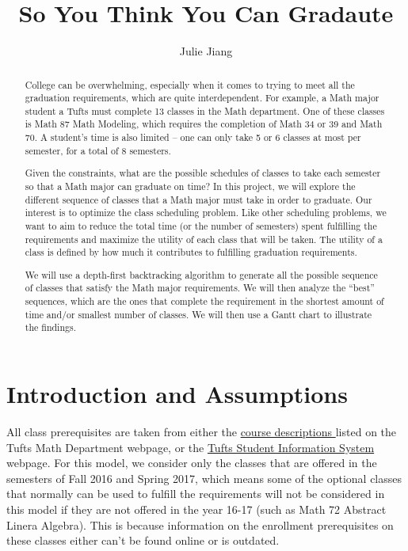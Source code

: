 \documentclass[12pt, oneside]{article}
\title{So You Think You Can Gradaute}
\author{Julie Jiang}
\begin{document}
\maketitle
\begin{abstract}
College can be overwhelming, especially when it comes to trying to meet all the graduation requirements, which are quite interdependent. For example, a Math major student a Tufts must complete 13 classes in the Math department. One of these classes is Math 87 Math Modeling, which requires the completion of Math 34 or 39 and Math 70. A student's time is also limited -- one can only take 5 or 6 classes at most per semester, for a total of 8 semesters. 


Given the constraints, what are the possible schedules of classes to take each semester so that a Math major can graduate on time? In this project, we will explore the different sequence of classes that a Math major must take in order to graduate. Our interest is to optimize the class scheduling problem. Like other scheduling problems, we want to aim to reduce the total time (or the number of semesters) spent fulfilling the requirements and maximize the utility of each class that will be taken. The utility of a class is defined by how much it contributes to fulfilling graduation requirements. 

We will use a depth-first backtracking algorithm to generate all the possible sequence of classes that satisfy the Math major requirements. We will then analyze the ``best'' sequences, which are the ones that complete the requirement in the shortest amount of time and/or smallest number of classes. We will then use a Gantt chart to illustrate the findings.

\end{abstract}
\section{Introduction and Assumptions} 
All class prerequisites are taken from either the \color{blue}\href{http://Math.tufts.edu/courses/}{course descriptions }\color{black}  listed on the Tufts Math Department webpage, or the \color{blue}\href{https://sis.uit.tufts.edu}{Tufts Student Information System }\color{black} webpage. For this model, we consider only the classes that are offered in the semesters of Fall 2016 and Spring 2017, which means some of the optional classes that normally can be used to fulfill the requirements will not be considered in this model if they are not offered in the year 16-17 (such as Math 72 Abstract Linera Algebra). This is because information on the enrollment prerequisites on these classes either can't be found online or is outdated. 
\end{document}
